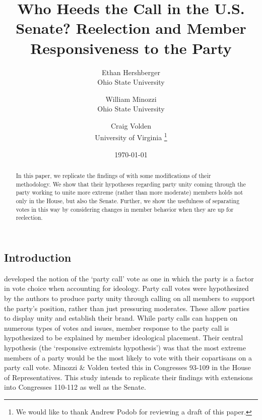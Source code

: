 \documentclass[12pt]{article}
\begin{document}
	\title{Who Heeds the Call in the U.S. Senate? Reelection and Member Responsiveness to the Party}
	
	\author{Ethan Hershberger\\Ohio State University \and William Minozzi\\Ohio State University \and Craig Volden\\University of Virginia \thanks{We would like to thank Andrew Podob for reviewing a draft of this paper.}}
	
	\date{\today}

\maketitle

\thispagestyle{empty}

\begin{abstract}
	\singlespacing
	\noindent
	In this paper, we replicate the findings of \cite{Minozzi:2013} with some modifications of their methodology. We show that their hypotheses regarding party unity coming through the party working to unite more extreme (rather than more moderate) members holds not only in the House, but also the Senate. Further, we show the usefulness of separating votes in this way by considering changes in member behavior when they are up for reelection.
\end{abstract}

\pagebreak
\setcounter{page}{1}

\doublespacing


\subsection*{Introduction}

\cite{Minozzi:2013} developed the notion of the `party call' vote as one in which the party is a factor in vote choice when accounting for ideology. Party call votes were hypothesized by the authors to produce party unity through calling on all members to support the party's position, rather than just pressuring moderates. These allow parties to display unity and establish their brand. While party calls can happen on numerous types of votes and issues, member response to the party call is hypothesized to be explained by member ideological placement. Their central hypothesis (the `responsive extremists hypothesis') was that the most extreme members of a party would be the most likely to vote with their copartisans on a party call vote. Minozzi \& Volden tested this in Congresses 93-109 in the House of Representatives. This study intends to replicate their findings with extensions into Congresses 110-112 as well as the Senate.
\end{document}
